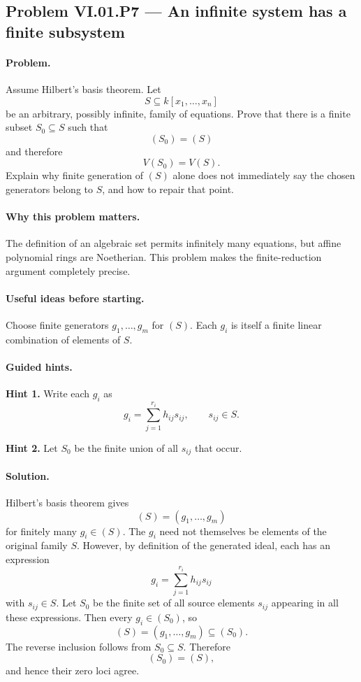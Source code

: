 \subsection*{Problem VI.01.P7 --- An infinite system has a finite subsystem}
\label{prob:vi01-p7}

\paragraph{Problem.}
Assume Hilbert's basis theorem.  Let
\[
S\subseteq k[x_1,\dots,x_n]
\]
be an arbitrary, possibly infinite, family of equations.  Prove that there is a finite
subset \(S_0\subseteq S\) such that
\[
(S_0)=(S)
\]
and therefore
\[
V(S_0)=V(S).
\]
Explain why finite generation of \((S)\) alone does not immediately say the chosen
generators belong to \(S\), and how to repair that point.

\ifdefined\FullProblemDossiers
\paragraph{Why this problem matters.}
The definition of an algebraic set permits infinitely many equations, but affine polynomial
rings are Noetherian.  This problem makes the finite-reduction argument completely precise.

\paragraph{Useful ideas before starting.}
Choose finite generators \(g_1,\dots,g_m\) for \((S)\).  Each \(g_i\) is itself a finite
linear combination of elements of \(S\).

\paragraph{Guided hints.}
\textbf{Hint 1.} Write each \(g_i\) as
\[
g_i=\sum_{j=1}^{r_i}h_{ij}s_{ij},
\qquad s_{ij}\in S.
\]

\textbf{Hint 2.} Let \(S_0\) be the finite union of all \(s_{ij}\) that occur.

\paragraph{Solution.}
Hilbert's basis theorem gives
\[
(S)=(g_1,\dots,g_m)
\]
for finitely many \(g_i\in(S)\).  The \(g_i\) need not themselves be elements of the
original family \(S\).  However, by definition of the generated ideal, each has an
expression
\[
g_i=\sum_{j=1}^{r_i}h_{ij}s_{ij}
\]
with \(s_{ij}\in S\).  Let \(S_0\) be the finite set of all source elements \(s_{ij}\)
appearing in all these expressions.  Then every \(g_i\in(S_0)\), so
\[
(S)=(g_1,\dots,g_m)\subseteq(S_0).
\]
The reverse inclusion follows from \(S_0\subseteq S\).  Therefore
\[
(S_0)=(S),
\]
and hence their zero loci agree.

